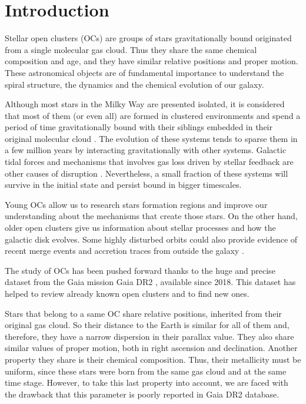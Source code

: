 \documentclass[11pt, a4paper, english]{book}
\begin{document}
\mainmatter
\chapter{Introduction}

Stellar open clusters (OCs) \cite{janes1982open} are groups of stars gravitationally bound originated from a single molecular gas cloud.
Thus they share the same chemical composition and age, and they have similar relative positions and proper motion.
These astronomical objects are of fundamental importance to understand the spiral structure,
the dynamics and the chemical evolution of our galaxy.

Although most stars in the Milky Way are presented isolated, it is considered that most of them (or even all)
are formed in clustered environments and spend a period of time gravitationally bound with their siblings embedded
in their original molecular cloud \cite{clarke2000theformationofstellarclusters} \cite{portegies2010young}.
The evolution of these systems tends to sparse them in a few million years by interacting gravitationally with other systems.
Galactic tidal forces and mechanisms that involves gas loss driven by stellar feedback are other causes of disruption
\cite{brinkmann2017bound}.
Nevertheless, a small fraction of these systems will survive in the initial state and persist bound in bigger timescales.

Young OCs allow us to research stars formation regions and improve our understanding about the mechanisms that create those stars.
On the other hand, older open clusters give us information about stellar processes and how the galactic disk evolves.
Some highly disturbed orbits could also provide evidence of recent merge events and accretion traces from outside the galaxy
\cite{cantat2016abundances}.

The study of OCs has been pushed forward thanks to the huge and precise dataset from the Gaia mission
\cite{collaboration2016description} Gaia DR2 \cite{gaia2018gaia}, available since 2018.
This dataset has helped to review already known open clusters and to find new ones.

Stars that belong to a same OC share relative positions, inherited from their original gas cloud.
So their distance to the Earth is similar for all of them and, therefore, they have a narrow dispersion in their parallax value.
They also share similar values of proper motion, both in right ascension and declination.
Another property they share is their chemical composition.
Thus, their metallicity must be uniform, since these stars were born from the same gas cloud and at the same time stage.
However, to take this last property into account, we are faced with the drawback that this parameter is poorly reported in Gaia DR2 database.
\end{document}
